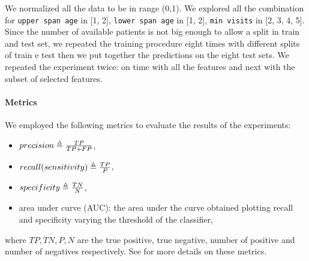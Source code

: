 We normalized all the data to be in range (0,1).
We explored all the combination for \texttt{upper span age} in [1, 2], \texttt{lower span age} in [1, 2], \texttt{min visits} in [2, 3, 4, 5]. Since the number of available patients is not big enough to allow a split in train and test set, we repeated the training procedure eight times with different splits of train e test then we put together the predictions on the eight test sets. We repeated the experiment twice: on time with all the features and next with the subset of selected features.

\paragraph{Metrics}
We employed the following metrics to evaluate the results of the experiments:
\begin{itemize}
	\item $precision \triangleq \frac{TP}{TP+FP}$,
	\item $recall(sensitivity) \triangleq \frac{TP}{P}$,
	\item $specificity \triangleq 	\frac{TN}{N}$,
	\item area under curve (AUC): the area under the curve obtained plotting recall and specificity varying the threshold of the classifier,
\end{itemize}
where $TP, TN, P, N$ are the true positive, true negative, number of positive and number of negatives respectively. See \cite{RocMetrics} for more details on these metrics.

